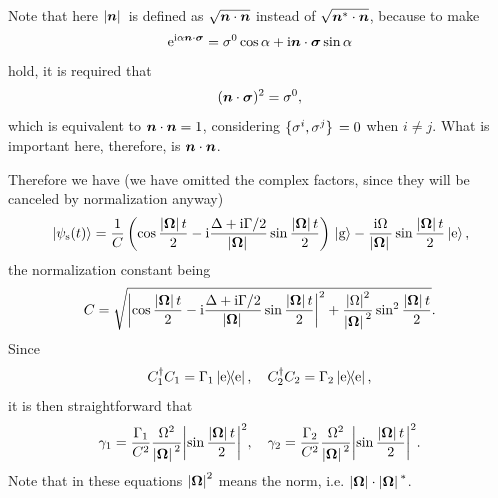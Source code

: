 \documentclass[hyperref, a4paper]{article}
\newcommand*{\ii}{\mathrm{i}}
\newcommand*{\ee}{\mathrm{e}}
\begin{document}
\begin{itemize}
\begin{equation}
\end{equation}
\begin{note*}{}{}
    Note that here $\abs*{\vb*{n}}$ is defined as $\sqrt{\vb*{n} \cdot \vb*{n}}$ instead of 
    $\sqrt{\vb*{n}^* \cdot \vb*{n}}$, because to make 
    \[
        \ee^{\ii \alpha \vb*{n} \cdot \vb*{\sigma}} = \sigma^0 \cos \alpha + \ii \vb*{n} \cdot \vb*{\sigma} \sin \alpha
    \]
    hold, it is required that 
    \[
        (\vb*{n} \cdot \vb*{\sigma})^2 = \sigma^0,
    \]
    which is equivalent to $\vb*{n} \cdot \vb*{n} = 1$, considering $\acomm*{\sigma^i}{\sigma^j} = 0$ 
    when $i \neq j$. What is important here, therefore, is $\vb*{n} \cdot \vb*{n}$.
\end{note*}
Therefore we have (we have omitted the complex factors, since they will be canceled by normalization anyway) 
\begin{equation}
    \ket*{\psi_\text{s}(t)} = \frac{1}{C} \left( \cos \frac{\abs*{\vb*{\Omega}} t}{2} - \ii \frac{\Delta + \ii \Gamma / 2}{\abs*{\vb*{\Omega}}} \sin \frac{\abs*{\vb*{\Omega}} t}{2}  \right) \ket*{\text{g}} - \frac{\ii \Omega}{\abs*{\vb*{\Omega}}} \sin \frac{\abs*{\vb*{\Omega}} t}{2} \ket*{\text{e}},
\end{equation}
the normalization constant being 
\begin{equation}
    C = \sqrt{ \abs{\cos \frac{\abs*{\vb*{\Omega}} t}{2} - \ii \frac{\Delta + \ii \Gamma / 2}{\abs*{\vb*{\Omega}}} \sin \frac{\abs*{\vb*{\Omega}} t}{2} }^2 + \frac{\abs{\Omega}^2}{\abs*{\vb*{\Omega}}^2} \sin^2 \frac{\abs*{\vb*{\Omega}} t}{2} }.
\end{equation}
Since  
\[
    C_1^\dagger C_1 = \Gamma_1 \dyad{\text{e}}, \quad C_2^\dagger C_2 = \Gamma_2 \dyad{\text{e}},
\]
it is then straightforward that 
\begin{equation}
    \gamma_1 = \frac{\Gamma_1}{{C}^2} \frac{\Omega^2}{\abs*{\vb*{\Omega}}^2} \abs{\sin \frac{\abs*{\vb*{\Omega}} t}{2}}^2,
    \quad \gamma_2 = \frac{\Gamma_2}{{C}^2} \frac{\Omega^2}{\abs*{\vb*{\Omega}}^2} \abs{\sin \frac{\abs*{\vb*{\Omega}} t}{2}}^2.
\end{equation}
Note that in these equations $\abs{\vb*{\Omega}}^2$ means the norm, i.e. $\abs{\vb*{\Omega}} \cdot \abs*{\vb*{\Omega}}^*$. 


\end{itemize}
\end{document}
